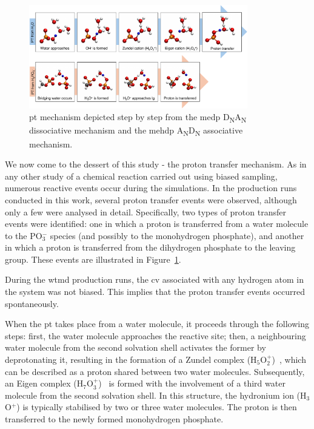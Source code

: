 \begin{figure}[b!]
    \centering
    \includegraphics[width=0.85\textwidth]{Figures/4_Results/results_proton_transfer.pdf}
    \caption{\Acf{pt} mechanism depicted step by step from the \ac{medp} D\textsubscript{N}A\textsubscript{N} dissociative mechanism and the \ac{mehdp} A\textsubscript{N}D\textsubscript{N} associative mechanism.}
    \label{fig:medp_proton_transfer}
\end{figure}

We now come to the dessert of this study - the proton transfer mechanism. As in any other study of a chemical reaction carried out using biased sampling, numerous reactive events occur during the simulations. In the production runs conducted in this work, several proton transfer events were observed, although only a few were analysed in detail. Specifically, two types of proton transfer events were identified: one in which a proton is transferred from a water molecule to the PO$_3^-$ species (and possibly to the monohydrogen phosphate), and another in which a proton is transferred from the dihydrogen phosphate to the leaving group. These events are illustrated in Figure~\ref{fig:medp_proton_transfer}.

During the \ac{wtmd} production runs, the \ac{cv} associated with any hydrogen atom in the system was not biased. This implies that the proton transfer events occurred spontaneously.

When the \ac{pt} takes place from a water molecule, it proceeds through the following steps: first, the water molecule approaches the reactive site; then, a neighbouring water molecule from the second solvation shell activates the former by deprotonating it, resulting in the formation of a Zundel complex (H$_5$O$_2^+$)~\citep{xantheasDancesHydrogenCations2009, zundelEnergiebanderTunnelndenUberschussProtonen1968}, which can be described as a proton shared between two water molecules. Subsequently, an Eigen complex (H$_7$O$_3^+$)~\citep{xantheasDancesHydrogenCations2009, eigenProtonTransferAcidBase1964} is formed with the involvement of a third water molecule from the second solvation shell. In this structure, the hydronium ion (H$_3$O$^+$) is typically stabilised by two or three water molecules. The proton is then transferred to the newly formed monohydrogen phosphate.

